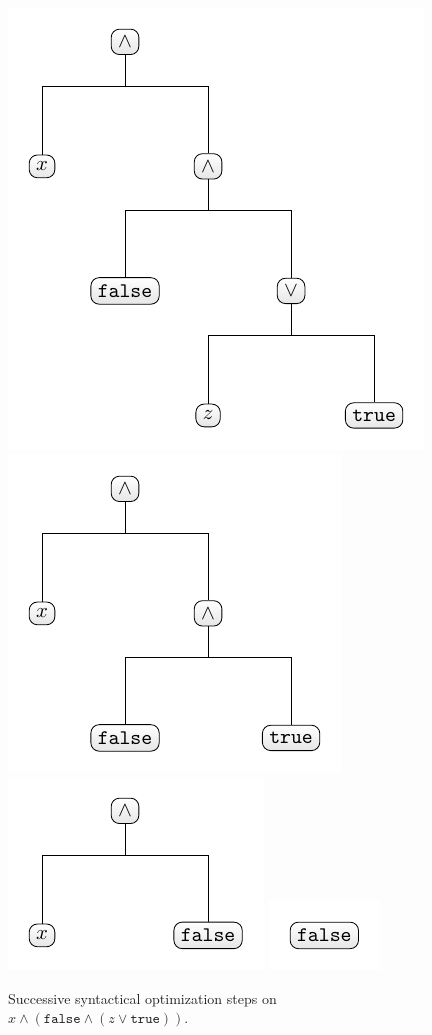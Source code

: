 \begin{figure}[t]
    \centering
    \includegraphics[scale=0.82,valign=t]{figures/optimizer1.pdf}
    \includegraphics[scale=0.82,valign=t]{figures/optimizer2.pdf}
    \includegraphics[scale=0.82,valign=t]{figures/optimizer3.pdf}
    \includegraphics[scale=0.82,valign=t]{figures/optimizer4.pdf}
    \caption{Successive syntactical optimization steps on $x \land (\texttt{false} \land (z \lor \texttt{true}))$.}
    \label{fig:optimizer}
\end{figure}

